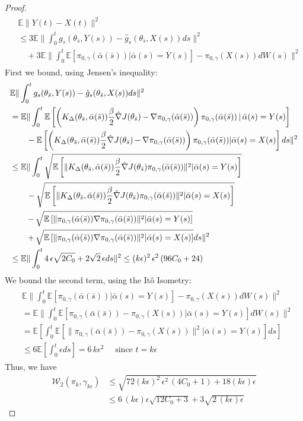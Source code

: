 \documentclass[journal,onecolumn]{IEEEtran}
\newcommand{\step}{\epsilon}
\newcommand{\grad}{\nabla}
\newcommand{\gradn}{\hat{\nabla}}
\newcommand{\rew}{J}
\newcommand{\CE}{\mathbb{E}}
\newcommand{\browns}{W(s)}
\newcommand{\alsbar}{\bar{\alpha}(s)}
\newcommand{\sbar}{\bar{s}}
\newcommand{\wass}{\mathcal{W}_2}
\newcommand{\K}{K}
\newcommand{\Kd}{\K_{\Delta}}
\newcommand{\alsbbar}{\bar{\alpha}(\sbar)}
\newcommand{\xt}{X(t)}
\newcommand{\yt}{Y(t)}
\newcommand{\dtlaw}{\ids_{k}} %
\newcommand{\ids}{\pi}
\newcommand{\idw}{\gamma}
\newcommand{\isp}{0,\idw}
\newcommand{\ksp}{k,\idw}
\newcommand{\idistrw}{\ids_{\isp}}
\newcommand{\ytlaw}{\gamma_{k\step}}
\begin{document}
{\begin{proof}
\begin{align}
\begin{split}
    &\CE\|\yt - \xt\|^2 \\
    &\leq 3\CE\|\int_0^t g_s(\theta_{\sbar},Y(s))-\hat{g}_s(\theta_{\sbar},X(s))ds\|^2 \\&
        \quad + 3\CE\|\int_0^t\CE\left[ \idistrw(\alsbbar) | \alsbar = Y(s)\right] - \idistrw(X(s))d\browns\|^2
\end{split}
\end{align}
First we bound, using Jensen's inequality:
\begin{align*}
    &\CE\|\int_0^t g_s(\theta_{\sbar},Y(s))-\hat{g}_s(\theta_{\sbar},X(s))ds\|^2 \\
    & = \CE\|\int_0^t\CE\left[\left(\Kd(\theta_{\sbar},\alsbbar)\frac{\beta}{2}\gradn \rew(\theta_{\sbar}) \,\color{black}{-}\, \grad\idistrw(\alsbbar)\right)\idistrw(\alsbbar) \, | \, \alsbar = Y(s) \right] \\
    &\quad \quad - \CE\left[\left(\Kd(\theta_{\sbar},\alsbbar)\frac{\beta}{2}\gradn \rew(\theta_{\sbar}) \,\color{black}{-}\, \grad\idistrw(\alsbbar)\right)\idistrw(\alsbbar) | \alsbar = X(s)\right]ds\|^2 \\
    &\leq \CE\|\int_0^t \sqrt{\CE\left[ 
    \|\Kd(\theta_{\sbar},\alsbbar)\frac{\beta}{2}\gradn \rew(\theta_{\sbar})\idistrw(\alsbbar)\|^2| \alsbar = Y(s)\right] }\\
    &\quad \quad - \sqrt{\CE\left[ \|\Kd(\theta_{\sbar},\alsbbar)\frac{\beta}{2}\gradn \rew(\theta_{\sbar})\idistrw(\alsbbar)\|^2 | \alsbar = X(s)\right]} \\
    &\quad \quad \,\color{black}{-}\, \sqrt{\CE\left[\|\idistrw(\alsbbar)\grad\idistrw(\alsbbar)\|^2  | \alsbar =Y(s)\right]} \\
    &\quad \quad \,\color{black}{+}\, \sqrt{\CE\left[\|\idistrw(\alsbbar)\grad\idistrw(\alsbbar)\|^2 | \alsbar = X(s)\right]}ds\|^2\\
    &\leq\CE\|\int_0^t 4\,\step\sqrt{2C_0} + 2\sqrt{2}\,\step ds\|^2 \leq (k\step)^2\,\step^2\,(96C_0 + 24)
\end{align*}
We bound the second term, using the It\^o Isometry:
\begin{align*}
\begin{split}
    &\CE\|\int_0^t\CE\left[ \idistrw(\alsbbar) | \alsbar = Y(s)\right] - \idistrw(X(s))d\browns\|^2 \\
    & = \CE\|\int_0^t\CE\left[ \idistrw(\alsbbar) - \idistrw(X(s)) | \alsbar = Y(s) \right]d\browns\|^2 \\
    & = \CE\left[\int_0^t \CE\left[\|\idistrw(\alsbbar) - \idistrw(X(s)) \|^2 |\alsbar = Y(s)  \right]ds\right] \\
    &\leq 6\CE\left[\int_0^t \step ds\right] = 6\,k\step^2  \quad\text{ since $t=k\epsilon$}
\end{split}   
\end{align*}
Thus, we have
\begin{align*}
    \wass(\dtlaw,\ytlaw) &\leq \sqrt{72(k\step)^2\,\step^2\,(4C_0 + 1) + 18(k\step)\step} \\
    &\leq 6\,(k\step)\step\sqrt{12C_0 + 3} + 3\sqrt{2\,(k\step)\step}
\end{align*}


\end{proof}}
\end{document}
